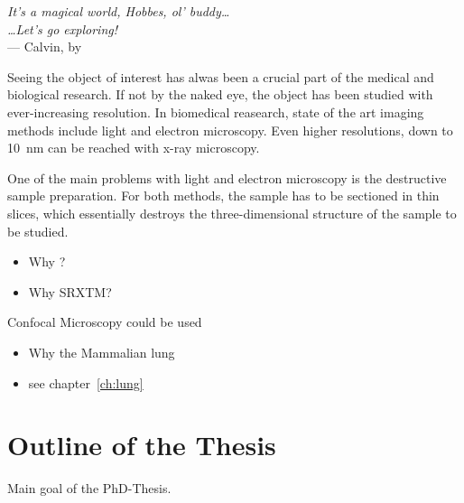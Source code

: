 \label{ch:Introduction}
\begin{flushright}{\slshape    
		It's a magical world, Hobbes, ol' buddy\dots\\
		\dots Let's go exploring!}\\ \medskip
		--- Calvin, by \citep{Watterson1996}
\end{flushright}
\bigskip

Seeing the object of interest has alwas been a crucial part of the medical and biological research. If not by the naked eye, the object has been studied with ever-increasing resolution. In biomedical reasearch, state of the art imaging methods include light and electron microscopy. Even higher resolutions, down to \SI{10}{\nano\meter}  can be reached with x-ray microscopy.

One of the main problems with light and electron microscopy is the destructive sample preparation. For both methods, the sample has to be sectioned in thin slices, which essentially destroys the three-dimensional structure of the sample to be studied.
\begin{itemize}
	\item Why \threed ?
	\item Why \ac{SRXTM}?
\end{itemize}

Confocal Microscopy could be used 

\begin{itemize}
	\item Why the Mammalian lung
	\item see chapter~\ref{ch:lung}
\end{itemize}

\section{Outline of the Thesis}
Main goal of the PhD-Thesis.

